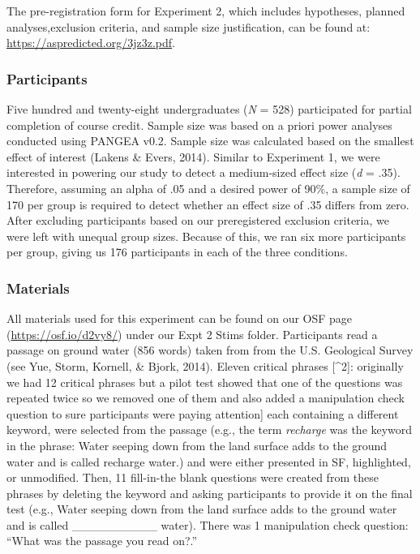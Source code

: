 \documentclass[english,doc]{apa6}
\begin{document}
The pre-registration form for Experiment 2, which includes hypotheses, planned analyses,exclusion criteria, and sample size justification, can be found at: \url{https://aspredicted.org/3jz3z.pdf}.

\hypertarget{participants-1}{%
\subsubsection{Participants}\label{participants-1}}

Five hundred and twenty-eight undergraduates (\emph{N} = 528) participated for partial completion of course credit. Sample size was based on a priori power analyses conducted using PANGEA v0.2. Sample size was calculated based on the smallest effect of interest (Lakens \& Evers, 2014). Similar to Experiment 1, we were interested in powering our study to detect a medium-sized effect size (\emph{d} = .35). Therefore, assuming an alpha of .05 and a desired power of 90\%, a sample size of 170 per group is required to detect whether an effect size of .35 differs from zero. After excluding participants based on our preregistered exclusion criteria, we were left with unequal group sizes. Because of this, we ran six more participants per group, giving us 176 participants in each of the three conditions.

\hypertarget{materials-1}{%
\subsubsection{Materials}\label{materials-1}}

All materials used for this experiment can be found on our OSF page (\url{https://osf.io/d2vy8/}) under our Expt 2 Stims folder. Participants read a passage on ground water (856 words) taken from from the U.S. Geological Survey (see Yue, Storm, Kornell, \& Bjork, 2014). Eleven critical phrases {[}\^{}2{]}: originally we had 12 critical phrases but a pilot test showed that one of the questions was repeated twice so we removed one of them and also added a manipulation check question to sure participants were paying attention{]} each containing a different keyword, were selected from the passage (e.g., the term \emph{recharge} was the keyword in the phrase: Water seeping down from the land surface adds to the ground water and is called recharge water.) and were either presented in SF, highlighted, or unmodified. Then, 11 fill-in-the blank questions were created from these phrases by deleting the keyword and asking participants to provide it on the final test (e.g., Water seeping down from the land surface adds to the ground water and is called \_\_\_\_\_\_\_\_\_\_ water). There was 1 manipulation check question: \enquote{What was the passage you read on?.}
\end{document}
